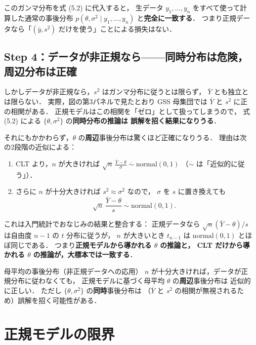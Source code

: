 \documentclass[lualatex,ja=standard,a4paper,12pt]{bxjsarticle}
\begin{document}
このガンマ分布を式 (5.2) に代入すると，
生データ $y_1, \ldots, y_n$ をすべて使って計算した通常の事後分布
$p(\theta, \sigma^2 \mid y_1, \ldots, y_n)$ と\textbf{完全に一致する}．
つまり正規データなら「$(\bar{y}, s^2)$ だけを使う」ことによる損失はない．

\subsection*{Step 4：データが非正規なら——同時分布は危険，周辺分布は正確}

しかしデータが非正規なら，$s^2$ はガンマ分布に従うとは限らず，
$\bar{Y}$ とも独立とは限らない．
実際，図の第3パネルで見たとおり GSS 母集団では
$\bar{Y}$ と $s^2$ に正の相関がある．
正規モデルはこの相関を「ゼロ」として扱ってしまうので，
式 (5.2) による $\{\theta, \sigma^2\}$ の\textbf{同時分布の推論は
誤解を招く結果になりうる}．

\medskip
それにもかかわらず，$\theta$ の\textbf{周辺}事後分布は驚くほど正確になりうる．
理由は次の2段階の近似による：
\begin{enumerate}
  \item CLT より，$n$ が大きければ
        $\displaystyle \sqrt{n}\,\frac{\bar{Y} - \theta}{\sigma}
        \;\overset{\cdot}{\sim}\; \mathrm{normal}(0, 1)$
        （$\overset{\cdot}{\sim}$ は「近似的に従う」）．
  \item さらに $n$ が十分大きければ $s^2 \approx \sigma^2$ なので，
        $\sigma$ を $s$ に置き換えても
        \[
          \sqrt{n}\,\frac{\bar{Y} - \theta}{s}
          \;\overset{\cdot}{\sim}\; \mathrm{normal}(0, 1).
        \]
\end{enumerate}
これは入門統計でおなじみの結果と整合する：
正規データなら $\sqrt{n}(\bar{Y} - \theta)/s$ は自由度 $n-1$ の $t$ 分布に従うが，
$n$ が大きいとき $t_{n-1}$ は $\mathrm{normal}(0,1)$ とほぼ同じである．
つまり\textbf{正規モデルから導かれる $\theta$ の推論と，
CLT だけから導かれる $\theta$ の推論が，大標本では一致する}．

\begin{thmbox}{母平均の事後分布（非正規データへの応用）}
$n$ が十分大きければ，データが正規分布に従わなくても，
正規モデルに基づく母平均 $\theta$ の\textbf{周辺}事後分布は
近似的に正しい．
ただし $\{\theta, \sigma^2\}$ の\textbf{同時}事後分布は
（$\bar{Y}$ と $s^2$ の相関が無視されるため）誤解を招く可能性がある．
\end{thmbox}

\section{正規モデルの限界}
\end{document}
